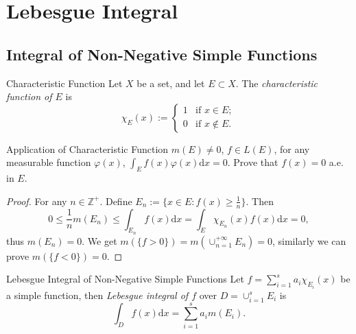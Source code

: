 

\section{Lebesgue Integral}

\subsection{Integral of Non-Negative Simple Functions}

\begin{definition}{Characteristic Function}{}
  Let $X$ be a set, and let $E \subset X$.
  The \emph{characteristic function of $E$} is
  \begin{equation}
    \chi_E(x) :=
    \begin{cases}
      1 & \text{if } x \in E;\\
      0 & \text{if } x \not \in E.
    \end{cases}
  \end{equation}
\end{definition}

\begin{example}{Application of Characteristic Function}{}
  $m (E) \neq 0$, $f \in L(E)$, for any measurable function $\varphi(x)$,
  $\int_E f(x)\varphi(x)\mathrm{d} x = 0$. Prove that $f(x) = 0$ a.e. in $E$.
\end{example}

\begin{proof}
  For any $n \in \mathbb{Z}^+$. Define $E_n := \{x \in E: f(x) \geq \frac{1}{n}\}$.
  Then
  \begin{equation}
    0 \leq \frac{1}{n} m(E_n) \leq \int_{E_n} f(x)\mathrm{d} x = \int_E \chi_{E_n}(x) f(x)\mathrm{d} x = 0,
  \end{equation}
  thus $m(E_n) = 0$.
  We get $m(\{f > 0\}) = m(\cup_{n=1}^{+\infty} E_n) = 0$, similarly we can prove $m(\{f < 0\}) = 0$.
\end{proof}

\begin{definition}{Lebesgue Integral of Non-Negative Simple Functions}{}
  Let $f = \sum _{i = 1}^s a_i \chi_{E_i}(x)$ be a simple function,
  then \emph{Lebesgue integral of $f$} over $D = \cup _{i = 1}^s E_i$ is
  \begin{equation}
    \int_D f(x)\mathrm{d} x = \sum\limits_{i = 1}^s a_i m(E_i).
  \end{equation}
\end{definition}

